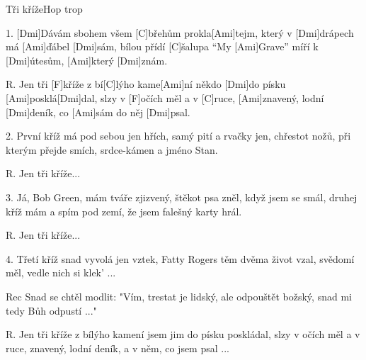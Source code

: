 \begin{song}{Tři kříže}{Hop trop}

\begin{xverse}{1. }
[Dmi]Dávám sbohem všem [C]břehům prokla[Ami]tejm,
který v [Dmi]drápech má [Ami]{}ďábel [Dmi]sám,
bílou přídí [C]{}šalupa ``My [Ami]Grave''
míří k [Dmi]{}útesům, [Ami]který [Dmi]znám.
\end{xverse}


\begin{xverse}{R. }
Jen tři [F]kříže z bí[C]lýho kame[Ami]ní
někdo [Dmi]do písku [Ami]posklá[Dmi]dal,
slzy v [F]očích měl a v [C]ruce, [Ami]znavený,
lodní [Dmi]deník, co [Ami]sám do něj [Dmi]psal.
\end{xverse}


\begin{xverse}{2. }
První kříž má pod sebou jen hřích,
samý pití a rvačky jen,
chřestot nožů, při kterým přejde smích,
srdce-kámen a jméno Stan.
\end{xverse}


\begin{xverse}{R. }
Jen tři kříže...
\end{xverse}


\begin{xverse}{3. }
Já, Bob Green, mám tváře zjizvený,
štěkot psa zněl, když jsem se smál,
druhej kříž mám a spím pod zemí,
že jsem falešný karty hrál.
\end{xverse}


\begin{xverse}{R. }
Jen tři kříže...
\end{xverse}


\begin{xverse}{4. }
Třetí kříž snad vyvolá jen vztek,
Fatty Rogers těm dvěma život vzal,
svědomí měl, vedle nich si klek' ...
\end{xverse}

\begin{xverse}{Rec}
Snad se chtěl modlit:
"Vím, trestat je lidský,
ale odpouštět božský,
snad mi tedy Bůh odpustí ..."
\end{xverse}

\begin{xverse}{R. }
Jen tři kříže z bílýho kamení
jsem jim do písku poskládal,
slzy v očích měl a v ruce, znavený,
lodní deník, a v něm, co jsem psal ...
\end{xverse}

\end{song}

